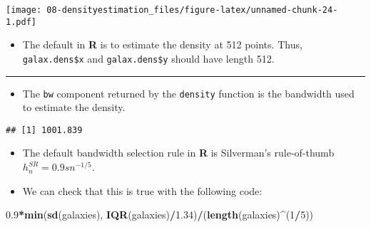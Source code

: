 \documentclass[]{book}
\newenvironment{Shaded}{\begin{snugshade}}{\end{snugshade}}
\newcommand{\DataTypeTok}[1]{\textcolor[rgb]{0.13,0.29,0.53}{#1}}
\newcommand{\DecValTok}[1]{\textcolor[rgb]{0.00,0.00,0.81}{#1}}
\newcommand{\FloatTok}[1]{\textcolor[rgb]{0.00,0.00,0.81}{#1}}
\newcommand{\KeywordTok}[1]{\textcolor[rgb]{0.13,0.29,0.53}{\textbf{#1}}}
\newcommand{\NormalTok}[1]{#1}
\newcommand{\OperatorTok}[1]{\textcolor[rgb]{0.81,0.36,0.00}{\textbf{#1}}}
\newcommand{\StringTok}[1]{\textcolor[rgb]{0.31,0.60,0.02}{#1}}
\providecommand{\tightlist}{%
  \setlength{\itemsep}{0pt}\setlength{\parskip}{0pt}}
\begin{document}
\begin{Shaded}
\end{Shaded}

\texttt{[image: 08-densityestimation\_files/figure-latex/unnamed-chunk-24-1.pdf]}

\begin{itemize}
\tightlist
\item
  The default in \textbf{R} is to estimate the density at 512 points. Thus, \texttt{galax.dens\$x}
  and \texttt{galax.dens\$y} should have length 512.
\end{itemize}

\begin{center}\rule{0.5\linewidth}{\linethickness}\end{center}

\begin{itemize}
\tightlist
\item
  The \texttt{bw} component returned by the \texttt{density} function is the bandwidth used to estimate the density.
\end{itemize}

\begin{Shaded}
\end{Shaded}

\begin{verbatim}
## [1] 1001.839
\end{verbatim}

\begin{itemize}
\item
  The default bandwidth selection rule in \textbf{R} is Silverman's rule-of-thumb \(h_{n}^{SR} = 0.9 s n^{-1/5}\).
\item
  We can check that this is true with the following code:
\end{itemize}

\begin{Shaded}
\begin{Highlighting}[]
\FloatTok{0.9}\OperatorTok{*}\KeywordTok{min}\NormalTok{(}\KeywordTok{sd}\NormalTok{(galaxies), }\KeywordTok{IQR}\NormalTok{(galaxies)}\OperatorTok{/}\FloatTok{1.34}\NormalTok{)}\OperatorTok{/}\NormalTok{(}\KeywordTok{length}\NormalTok{(galaxies)}\OperatorTok{^}\NormalTok{(}\DecValTok{1}\OperatorTok{/}\DecValTok{5}\NormalTok{))}
\end{Highlighting}
\end{Shaded}
\end{document}
